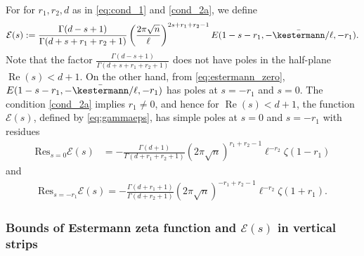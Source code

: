 \documentclass[]{article}
\renewcommand{\Re}{\operatorname{Re}}
\begin{document}
For for $r_1, r_2, d$ as in \eqref{eq:cond_1} and \eqref{cond_2a}, we define  
\begin{equation}\label{eq:gammaeps}\mathcal{E}(s):=\frac{   \Gamma(d-s+1)  }{\Gamma (d+s+r_1+r_2+1)  }      \left( \frac{2 \pi \sqrt{n}}{\ell} \right)^{2s+r_1+r_2-1} E(1-s-r_1,-\bar{\kestermann}/\ell,-r_1).\end{equation}
Note that the factor $\frac{   \Gamma(d-s+1)  }{\Gamma (d+s+r_1+r_2+1)  }$ does not have poles in the half-plane $\Re(s) < d+1$. 
On the other hand, from \eqref{eq:estermann_zero}, $E(1-s-r_1,-\bar{\kestermann}/\ell,-r_1)$  has poles at %
$s=-r_1$ and  $s=0$. The condition \eqref{cond_2a} implies $r_1 \neq 0$, and hence for $\Re(s)<d+1$, the function $\mathcal{E}(s)$, defined by \eqref{eq:gammaeps},  
 has  simple poles at $s=0$ and $s=-r_1 $  with residues
\begin{equation}\label{eq:pole0}
\begin{split}
\text{Res}_{s=0} \mathcal{E}(s) 
&= -\frac{   \Gamma(d+1)  }{\Gamma (d+r_1+r_2+1)  }      \left(2 \pi \sqrt{n} \right)^{r_1+r_2-1}\ell^{-r_2} \zeta(1-r_1)
\end{split}    
\end{equation}
and
\begin{equation}\label{eq:pole-r1}
    \begin{split}
\text{Res}_{s=-r_1} \mathcal{E}(s) 
 =- \frac{   \Gamma(d+r_1+1)  }{\Gamma (d+r_2+1)  }      \left( 2 \pi \sqrt{n}\right)^{-r_1+r_2-1}   \ell^{-r_2}\zeta(1+r_1).     
    \end{split}
\end{equation}


\subsubsection{Bounds of Estermann zeta function and $\mathcal{E}(s)$ in vertical strips}
\end{document}
